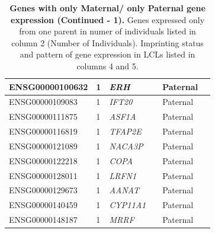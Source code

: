 \begin{table}
\begin{adjustbox}{width={\textwidth}}
\begin{tabular}{@{}p{4cm}p{3cm}p{3cm}p{3cm}p{3cm}p{3cm}@{}}
ENSG00000100632 & 1 & \emph{ERH} & &  Paternal &   \\ \hline
ENSG00000109083 & 1 & \emph{IFT20} & &  Paternal &  \\ \hline
ENSG00000111875 & 1 & \emph{ASF1A} & &  Paternal &   \\ \hline
ENSG00000116819 & 1 & \emph{TFAP2E} & &  Paternal &   \\ \hline
ENSG00000121089 & 1 & \emph{NACA3P} & &  Paternal &   \\ \hline
ENSG00000122218 & 1 & \emph{COPA}& &  Paternal &   \\ \hline
ENSG00000128011 & 1 & \emph{LRFN1} & &  Paternal &   \\ \hline
ENSG00000129673 & 1 & \emph{AANAT} & & Paternal  & \\ \hline
ENSG00000140459 & 1 & \emph{CYP11A1} & &  Paternal &   \\ \hline
ENSG00000148187 & 1 & \emph{MRRF} & &  Paternal &   \\ \hline
\end{tabular}
\end{adjustbox}
\caption[Genes with only Maternal/ only Paternal gene expression (Continued - 1). ]{\textbf{Genes with only Maternal/ only Paternal gene expression (Continued - 1).  }Genes expressed only from one parent in numer of individuals listed in column 2 (Number of Individuals). Imprinting status and pattern of gene expression in LCLs listed in columns 4 and 5.}
\label{tab:oneparentexpression2}
\end{table}


